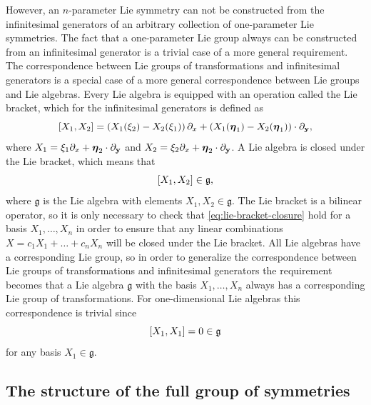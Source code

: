 However, an \(n\)-parameter Lie symmetry can not be constructed from the infinitesimal generators of an arbitrary collection of one-parameter Lie symmetries.
The fact that a one-parameter Lie group always can be constructed from an infinitesimal generator is a trivial case of a more general requirement.
The correspondence between Lie groups of transformations and infinitesimal generators is a special case of a more general correspondence between Lie groups and Lie algebras.
Every Lie algebra is equipped with an operation called the Lie bracket, which for the infinitesimal generators is defined as
\begin{equation} \label{eq:lie-bracket}
  \comm{X_1}{X_2} = \left(X_1(\xi_2) - X_2(\xi_1)\right) \partial_x + \left(X_1(\vb*{\eta}_1) - X_2(\vb*{\eta}_1)\right) \cdot \partial_{\vb{y}},
\end{equation}
where \(X_1 = \xi_1 \partial_x + \vb*{\eta}_2 \cdot \partial_{\vb{y}}\) and \(X_2 = \xi_2 \partial_x + \vb*{\eta}_2 \cdot \partial_{\vb{y}}\).
A Lie algebra is closed under the Lie bracket, which means that
\begin{equation} \label{eq:lie-bracket-closure}
  \comm{X_1}{X_2} \in \mathfrak{g},
\end{equation}
where \(\mathfrak{g}\) is the Lie algebra with elements \(X_1, X_2 \in \mathfrak{g}\).
The Lie bracket is a bilinear operator, so it is only necessary to check that \cref{eq:lie-bracket-closure} hold for a basis \(X_1, \dots, X_n\) in order to ensure that any linear combinations \(X = c_1 X_1 + \dots + c_n X_n\) will be closed under the Lie bracket.
All Lie algebras have a corresponding Lie group, so in order to generalize the correspondence between Lie groups of transformations and infinitesimal generators the requirement becomes that a Lie algebra \(\mathfrak{g}\) with the basis \(X_1, \dots, X_n\) always has a corresponding Lie group of transformations.
For one-dimensional Lie algebras this correspondence is trivial since
\begin{equation}
  \comm{X_1}{X_1} = 0 \in \mathfrak{g}
\end{equation}
for any basis \(X_1 \in \mathfrak{g}\).

\subsection{The structure of the full group of symmetries}

